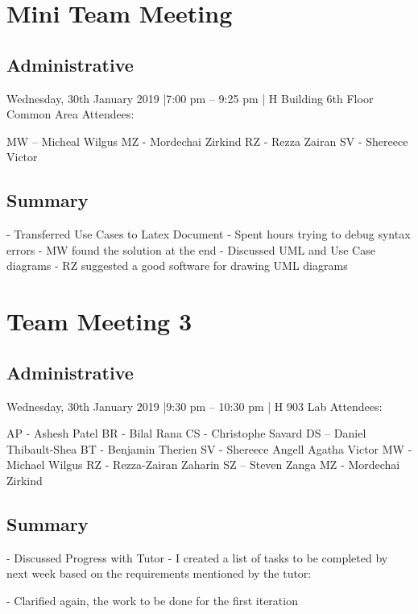 \documentclass[12pt]{article}
\begin{document}
\pagebreak
\section{Mini Team Meeting }

\subsection{Administrative}
Wednesday, 30th January 2019 |7:00 pm – 9:25 pm | H Building 6th Floor Common Area 
Attendees: 

MW – Micheal Wilgus
MZ - Mordechai Zirkind  
RZ - Rezza Zairan 
SV - Shereece Victor 




\subsection{Summary}
-	Transferred Use Cases to Latex Document 
-	Spent hours trying to debug syntax errors
-	MW found the solution at the end 
-	Discussed UML and Use Case diagrams 
-	RZ suggested a good software for drawing UML diagrams 



\pagebreak
\section{Team Meeting 3 }

\subsection{Administrative}
Wednesday, 30th January 2019 |9:30 pm – 10:30 pm | H 903 Lab
Attendees: 

AP - Ashesh Patel
BR - Bilal Rana
CS - Christophe Savard
DS – Daniel Thibault-Shea
BT - Benjamin Therien
SV - Shereece Angell Agatha Victor
MW - Michael Wilgus
RZ - Rezza-Zairan Zaharin
SZ – Steven Zanga
MZ - Mordechai Zirkind





\subsection{Summary}
-	Discussed Progress with Tutor 
-	I created a list of tasks to be completed by next week based on the requirements mentioned by the tutor:

-	Clarified again, the work to be done for the first iteration 




\pagebreak
\end{document}
